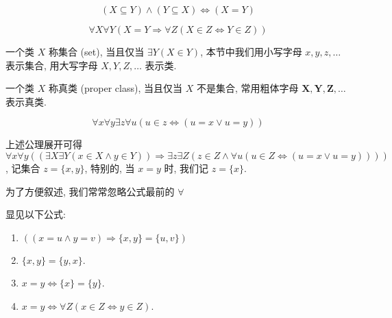 \begin{corollary}
    \[
        (X \subseteq Y) \land (Y \subseteq X) \Leftrightarrow (X = Y)
    \]
\end{corollary}

\begin{axiom}
    \label {axiom:NBG Axiom of Equality}
    \[
        \forall X \forall Y (X = Y \Rightarrow \forall Z (X \in Z \Leftrightarrow Y \in Z))
    \]
\end{axiom}

\begin{definition}[集合]
    一个类 \(X\) 称集合 (set), 当且仅当 \(\exists Y (X \in Y)\), 本节中我们用小写字母 \(x, y, z, \dots\) 表示集合, 用大写字母 \(X, Y, Z, \dots\) 表示类.
\end{definition}

\begin{definition}[真类]
    一个类 \(X\) 称真类 (proper class), 当且仅当 \(X\) 不是集合, 常用粗体字母 \(\mathbf{X}, \mathbf{Y}, \mathbf{Z}, \dots\) 表示真类.
\end{definition}

\begin{axiom}
    \label {axiom:NBG Axiom of Pair}
    \[
        \forall x \forall y \exists z \forall u (u \in z \Leftrightarrow (u = x \lor u = y))
    \]
\end{axiom}

上述公理展开可得 \(\forall x \forall y ((\exists X \exists Y (x \in X \land y \in Y)) \Rightarrow \exists z \exists Z (z \in Z \land \forall u (u \in Z \Leftrightarrow (u = x \lor u = y))))\),
记集合 \(z = \{x,y\}\), 特别的, 当 \(x = y\) 时, 我们记 \(z = \{x\}\).

为了方便叙述, 我们常常忽略公式最前的 \(\forall\)

\begin{corollary}
    显见以下公式:

    \begin{enumerate}
        \item \(((x = u \land y = v) \Rightarrow \{x,y\} = \{u,v\})\)
        \item \(\{x,y\} = \{y,x\}\).
        \item \(x = y \Leftrightarrow \{x\} = \{y\}\).
        \item \(x = y \Leftrightarrow \forall Z (x \in Z \Leftrightarrow y \in Z)\).
    \end{enumerate}
\end{corollary}

